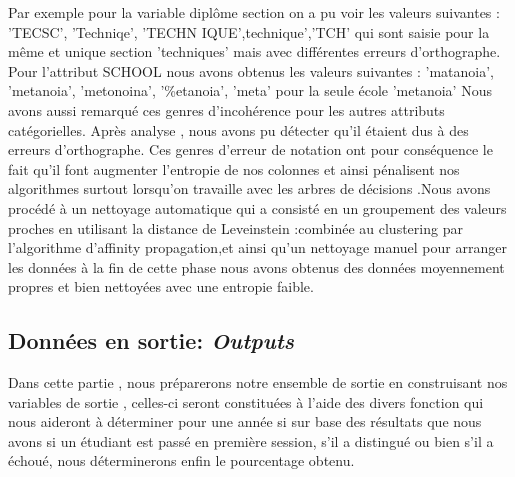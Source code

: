 Par exemple pour la variable diplôme section on a pu voir les valeurs suivantes : 'TECSC', 'Techniqe',
'TECHN IQUE',technique','TCH' qui sont saisie pour la même et unique
section 'techniques' mais avec différentes erreurs d'orthographe. \\
Pour l'attribut SCHOOL nous avons obtenus les valeurs suivantes :
'matanoia', 'metanoia', 'metonoina', '\%etanoia', 'meta' pour la seule école 'metanoia'
Nous avons aussi remarqué ces genres d'incohérence pour les autres attributs catégorielles.  
Après analyse , nous avons pu détecter qu'il étaient  dus à des erreurs d'orthographe.
Ces genres d'erreur de notation ont pour conséquence le fait qu'il font
augmenter l'entropie de nos colonnes et ainsi pénalisent nos algorithmes
surtout lorsqu'on travaille avec les arbres de décisions .Nous avons
procédé à un nettoyage automatique qui a consisté en un groupement des
valeurs proches en utilisant la distance de Leveinstein :\cite{LevStack}combinée au  clustering par l'algorithme d'affinity propagation,et
ainsi qu'un nettoyage manuel pour arranger les données à la fin de
cette phase nous avons obtenus des données moyennement propres et bien
nettoyées avec une entropie faible.
 \subsection{Données en sortie: \emph{Outputs}}

 Dans cette partie , nous préparerons notre ensemble de sortie en
 construisant nos variables de sortie , celles-ci seront constituées à
 l'aide des divers fonction qui nous aideront à déterminer pour une année
 si sur base des résultats que nous avons si un étudiant est passé en
 première session, s'il a distingué ou bien s'il a échoué, nous
 déterminerons enfin le pourcentage obtenu.
 
